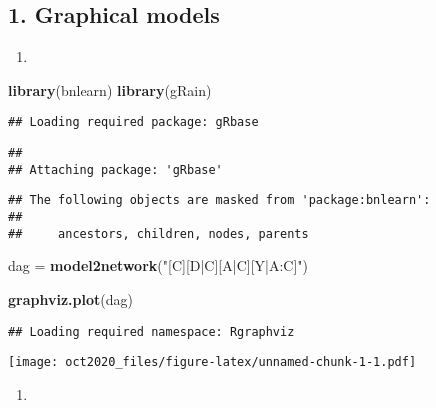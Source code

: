 \documentclass[
]{article}
\author{}
\date{\vspace{-2.5em}}
\newenvironment{Shaded}{\begin{snugshade}}{\end{snugshade}}
\newcommand{\FunctionTok}[1]{\textcolor[rgb]{0.13,0.29,0.53}{\textbf{#1}}}
\newcommand{\NormalTok}[1]{#1}
\newcommand{\OtherTok}[1]{\textcolor[rgb]{0.56,0.35,0.01}{#1}}
\newcommand{\StringTok}[1]{\textcolor[rgb]{0.31,0.60,0.02}{#1}}
\providecommand{\tightlist}{%
  \setlength{\itemsep}{0pt}\setlength{\parskip}{0pt}}
\begin{document}
\subsection{1. Graphical models}\label{graphical-models}

\begin{enumerate}
\def\labelenumi{\arabic{enumi})}
\tightlist
\item
\end{enumerate}

\begin{Shaded}
\begin{Highlighting}[]
\FunctionTok{library}\NormalTok{(bnlearn)}
\FunctionTok{library}\NormalTok{(gRain)}
\end{Highlighting}
\end{Shaded}

\begin{verbatim}
## Loading required package: gRbase
\end{verbatim}

\begin{verbatim}
## 
## Attaching package: 'gRbase'
\end{verbatim}

\begin{verbatim}
## The following objects are masked from 'package:bnlearn':
## 
##     ancestors, children, nodes, parents
\end{verbatim}

\begin{Shaded}
\begin{Highlighting}[]
\NormalTok{dag }\OtherTok{=} \FunctionTok{model2network}\NormalTok{(}\StringTok{"[C][D|C][A|C][Y|A:C]"}\NormalTok{)}

\FunctionTok{graphviz.plot}\NormalTok{(dag)}
\end{Highlighting}
\end{Shaded}

\begin{verbatim}
## Loading required namespace: Rgraphviz
\end{verbatim}

\texttt{[image: oct2020\_files/figure-latex/unnamed-chunk-1-1.pdf]}

\begin{enumerate}
\def\labelenumi{\arabic{enumi})}
\setcounter{enumi}{1}
\tightlist
\item
\end{enumerate}
\end{document}
